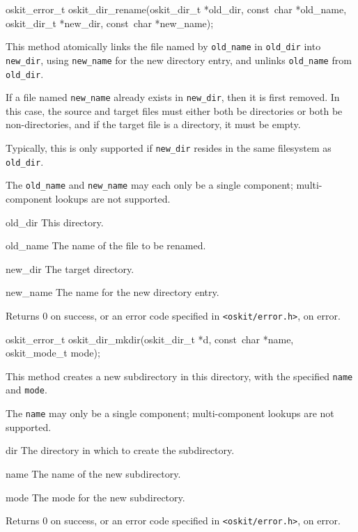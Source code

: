 \begin{apisyn}

	\funcproto oskit_error_t
	oskit_dir_rename(oskit_dir_t *old_dir, const~char *old_name,
			 oskit_dir_t *new_dir, const~char *new_name); 
\end{apisyn}
\ostofs
\begin{apidesc}
	This method atomically links the file named by {\tt old_name} in 
	{\tt old_dir} into {\tt new_dir}, using {\tt new_name} for the
	new directory entry, and unlinks {\tt old_name} from {\tt old_dir}. 

	If a file named {\tt new_name} already exists in {\tt new_dir}, 
	then it is first removed.  In this case, the source and target files
	must either both be directories or both be non-directories,
	and if the target file is a directory, it must be empty.

	Typically, this is only supported if {\tt new_dir}
	resides in the same filesystem as {\tt old_dir}.

	The {\tt old_name} and {\tt new_name} may each only be 
	a single component; multi-component lookups are not supported.
\end{apidesc}
\begin{apiparm}
	\item[old_dir]
		This directory.
	\item[old_name]
		The name of the file to be renamed.
	\item[new_dir]
		The target directory.
	\item[new_name]
		The name for the new directory entry.
\end{apiparm}
\begin{apiret}
	Returns 0 on success, or an error code specified in
	{\tt <oskit/error.h>}, on error.
\end{apiret}


\begin{apisyn}

	\funcproto oskit_error_t
	oskit_dir_mkdir(oskit_dir_t *d, const~char *name,	
		       oskit_mode_t mode);	
\end{apisyn}
\ostofs
\begin{apidesc}
	This method creates a new subdirectory in this directory,
	with the specified {\tt name} and {\tt mode}.

	The {\tt name} may only be a single component; 
	multi-component lookups are not supported.
\end{apidesc}
\begin{apiparm}
	\item[dir]
		The directory in which to create the subdirectory.
	\item[name]
		The name of the new subdirectory.
	\item[mode]
		The mode for the new subdirectory.
\end{apiparm}
\begin{apiret}
	Returns 0 on success, or an error code specified in
	{\tt <oskit/error.h>}, on error.
\end{apiret}


